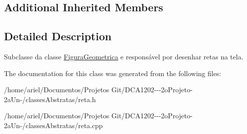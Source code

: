 \subsection*{Additional Inherited Members}


\subsection{Detailed Description}
Subclasse da classe \hyperlink{class_figura_geometrica}{Figura\+Geometrica} e responsável por desenhar retas na tela. 

The documentation for this class was generated from the following files\+:\begin{DoxyCompactItemize}
\item 
/home/ariel/\+Documentos/\+Projetos Git/\+D\+C\+A1202-\/-\/-\/2o\+Projeto-\/2a\+Un-\//classes\+Abstratas/reta.\+h\item 
/home/ariel/\+Documentos/\+Projetos Git/\+D\+C\+A1202-\/-\/-\/2o\+Projeto-\/2a\+Un-\//classes\+Abstratas/reta.\+cpp\end{DoxyCompactItemize}
